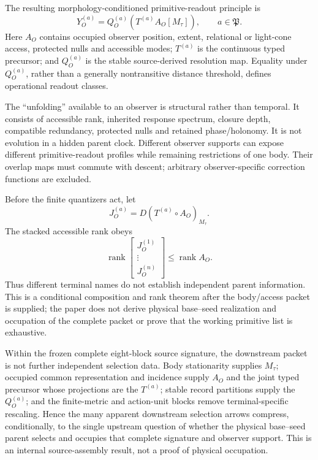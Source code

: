 \documentclass[11pt]{article}
\begin{document}
The resulting morphology-conditioned primitive-readout principle is
\begin{equation}
 Y_O^{(a)}
 =Q_O^{(a)}\!\left(T^{(a)}A_O[M_\tau]\right),
 \qquad a\in\mathfrak P.
 \label{eq:morph-conditioned-primitive}
\end{equation}
Here $A_O$ contains occupied observer position, extent, relational or
light-cone access, protected nulls and accessible modes; $T^{(a)}$ is the
continuous typed precursor; and $Q_O^{(a)}$ is the stable source-derived
resolution map. Equality under $Q_O^{(a)}$, rather than a generally
nontransitive distance threshold, defines operational readout classes.

The ``unfolding'' available to an observer is structural rather than
temporal. It consists of accessible rank, inherited response spectrum,
closure depth, compatible redundancy, protected nulls and retained
phase/holonomy. It is not evolution in a hidden parent clock. Different
observer supports can expose different primitive-readout profiles while
remaining restrictions of one body. Their overlap maps must commute with
descent; arbitrary observer-specific correction functions are excluded.

Before the finite quantizers act, let
\[
 J_O^{(a)}=D(T^{(a)}\circ A_O)_{M_\tau}.
\]
The stacked accessible rank obeys
\begin{equation}
 \operatorname{rank}
 \begin{bmatrix}J_O^{(1)}\\ \vdots\\ J_O^{(n)}\end{bmatrix}
 \leq \operatorname{rank}A_O.
 \label{eq:primitive-stacked-rank}
\end{equation}
Thus different terminal names do not establish independent parent
information. This is a conditional composition and rank theorem after the
body/access packet is supplied; the paper does not derive physical base--seed
realization and occupation
of the complete packet or prove that the working primitive list is exhaustive.

Within the frozen complete eight-block source signature, the downstream
packet is not further independent selection data. Body stationarity supplies
$M_\tau$; occupied common representation and incidence supply $A_O$ and the
joint typed precursor whose projections are the $T^{(a)}$; stable record
partitions supply the $Q_O^{(a)}$; and the finite-metric and action-unit blocks
remove terminal-specific rescaling. Hence the many apparent downstream
selection arrows compress, conditionally, to the single upstream question of
whether the physical base--seed parent selects and occupies that complete
signature and observer support. This is an internal source-assembly result,
not a proof of physical occupation.
\end{document}
